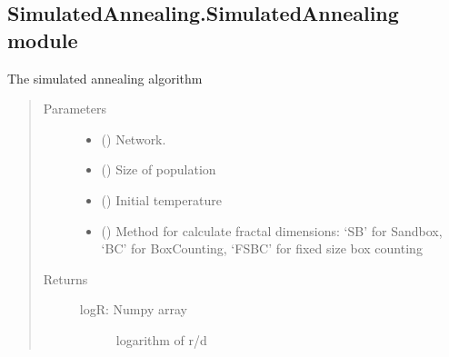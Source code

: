 \documentclass[letterpaper,10pt,english]{sphinxmanual}
\begin{document}
\subsection{SimulatedAnnealing.SimulatedAnnealing module}
\label{\detokenize{SimulatedAnnealing:module-SimulatedAnnealing.SimulatedAnnealing}}\label{\detokenize{SimulatedAnnealing:simulatedannealing-simulatedannealing-module}}

\begin{fulllineitems}
\label{\detokenize{SimulatedAnnealing:SimulatedAnnealing.SimulatedAnnealing.SA}}
The simulated annealing algorithm
\begin{quote}\begin{description}
\item[{Parameters}] \leavevmode\begin{itemize}
\item {} 
 () \textendash{} Network.

\item {} 
 () \textendash{} Size of population

\item {} 
 () \textendash{} Initial temperature

\item {} 
 () \textendash{} Method for calculate fractal dimensions: ‘SB’ for Sandbox, ‘BC’ for BoxCounting, ‘FSBC’ for fixed size box counting

\end{itemize}

\item[{Returns}] \leavevmode
\begin{description}
\item[{logR: Numpy array}] \leavevmode
logarithm of r/d


\end{description}
\end{description}
\end{quote}
\end{fulllineitems}
\end{document}

